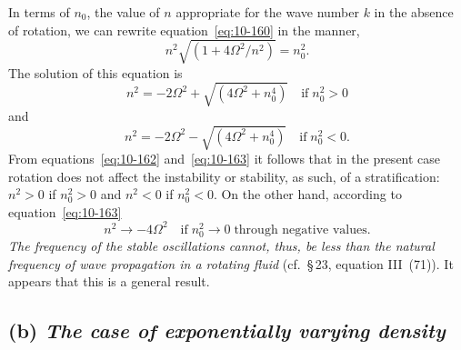 In terms of $n_0$, the value of $n$ appropriate for the wave number $k$ in the absence of rotation, we can rewrite equation~\eqref{eq:10-160} in the manner,
\begin{equation}
\label{eq:10-161}
n^2\sqrt{(1+4\Omega^2/n^2)} = n_0^2.
\end{equation}
The solution of this equation is
\begin{equation}
\label{eq:10-162}
n^2 = -2\Omega^2+\sqrt{(4\Omega^2+n_0^4)} \quad\text{if}\; n_0^2 > 0
\end{equation}
and
\begin{equation}
\label{eq:10-163}
n^2 = -2\Omega^2-\sqrt{(4\Omega^2+n_0^4)} \quad\text{if}\; n_0^2 < 0.
\end{equation}
From equations~\eqref{eq:10-162} and~\eqref{eq:10-163} it follows that in the present case rotation does not affect the instability or stability, as such, of a stratification: $n^2 > 0$ if $n_0^2 > 0$ and $n^2 < 0$ if $n_0^2 < 0$. On the other hand, according to equation~\eqref{eq:10-163}
\begin{equation}
\label{eq:10-164}
n^2 \to -4\Omega^2 \quad\text{if}\; n_0^2 \to 0\;\text{through negative values.}
\end{equation}
\emph{The frequency of the stable oscillations cannot, thus, be less than the natural frequency of wave propagation in a rotating fluid} (cf.\ \S\,23, equation III~(71)). It appears that this is a general result.

\subsection*{(b) \textit{The case of exponentially varying density}}

